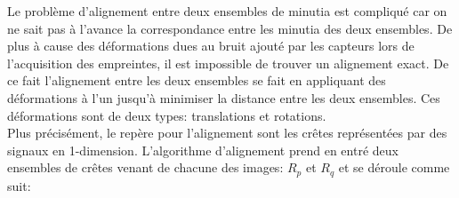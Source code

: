 \documentclass{report}
\begin{document}
Le problème d'alignement entre deux ensembles de minutia est
compliqué car on ne sait pas à l'avance la correspondance entre les
minutia des deux ensembles. De plus à cause des déformations dues au
bruit ajouté par les capteurs lors de l'acquisition des empreintes, il
est impossible de trouver un alignement exact. De ce fait l'alignement
entre les deux ensembles se fait en appliquant des déformations à l'un
jusqu'à minimiser la distance entre les deux ensembles. Ces
déformations sont de deux types: translations et rotations.\\
Plus précisément, le repère pour l'alignement sont les crêtes
représentées par des signaux en 1-dimension. L'algorithme d'alignement
prend en entré deux ensembles de crêtes venant de chacune des images:
$R_p$ et $R_q$ et se déroule comme suit:
\end{document}
